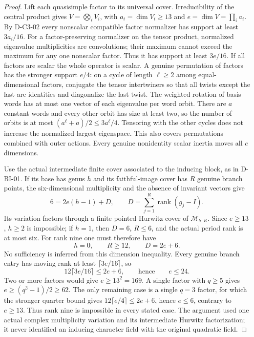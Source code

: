 \begin{proof}
Lift each quasisimple factor to its universal cover. Irreducibility
of the central product gives
$V=\bigotimes_i V_i$, with $a_i=\dim V_i\ge13$ and
$e=\dim V=\prod_i a_i$. By D-C3-02 every nonscalar compatible
factor normalizer has support at least $3a_i/16$.
For a factor-preserving normalizer on the tensor product, normalized
eigenvalue multiplicities are convolutions; their maximum cannot
exceed the maximum for any one nonscalar factor. Thus it has
support at least $3e/16$. If all factors are scalar the whole
operator is scalar. A genuine permutation of factors has the
stronger support $e/4$: on a cycle of length $\ell\ge2$ among
equal-dimensional factors, conjugate the tensor intertwiners
so that all twists except the last are identities and diagonalize
the last twist. The weighted rotation of basis words has at most
one vector of each eigenvalue per word orbit. There are $a$
constant words and every other orbit has size at least two,
so the number of orbits is at most
$(a^\ell+a)/2\le3a^\ell/4$. Tensoring with the other cycles
does not increase the normalized largest eigenspace. This also
covers permutations combined with outer actions. Every genuine
nonidentity scalar inertia moves all $e$ dimensions.

Use the actual intermediate finite cover associated to the
inducing block, as in D-BI-01. If its base has genus $h$ and
its faithful-image cover has $R$ genuine branch points, the
six-dimensional multiplicity and the absence of invariant
vectors give
\[
        6=2e(h-1)+D,\qquad
        D=\sum_{j=1}^R\operatorname{rank}(g_j-I).
                                                               \tag{C3.19}
\]
Its variation factors through a finite pointed Hurwitz cover of
$\mathcal M_{h,R}$. Since $e\ge13$, $h\ge2$ is impossible;
if $h=1$, then $D=6$, $R\le6$, and the actual period rank
is at most six. For rank nine one must therefore have
\[
                  h=0,\qquad R\ge12,\qquad D=2e+6.
                                                               \tag{C3.20}
\]
No sufficiency is inferred from this dimension inequality.
Every genuine branch entry has moving rank at least
$\lceil3e/16\rceil$, so
\[
        12\lceil3e/16\rceil\le2e+6,
             \qquad\text{hence}\qquad e\le24.
                                                               \tag{C3.21}
\]
Two or more factors would give $e\ge13^2=169$.
A single factor with $q\ge5$ gives
$e\ge(q^3-1)/2\ge62$. The only remaining case is a single
$q=3$ factor, for which the stronger quarter bound gives
$12\lceil e/4\rceil\le2e+6$, hence $e\le6$, contrary to
$e\ge13$. Thus rank nine is impossible in every stated case.
The argument used one actual complex multiplicity variation and
its intermediate Hurwitz factorization; it never identified an
inducing character field with the original quadratic field.
\end{proof}
